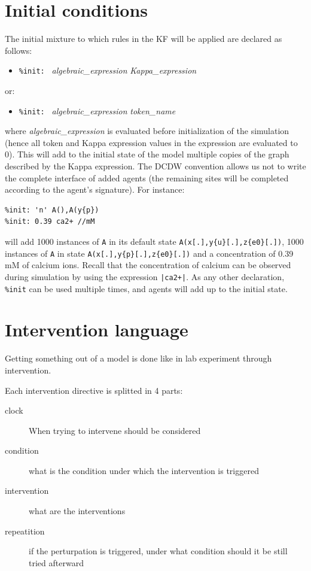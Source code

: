 \documentclass[11pt]{book}
\def\ttt#1{\texttt{#1}}
\def\ITE#1{\begin{itemize}#1\end{itemize}}
\begin{document}
\section{Initial conditions}\label{sec:init}

The initial mixture to which rules in the
KF will be applied are declared as follows: \ITE{
\item[] \ttt{\%init: } \textit{algebraic\_expression} \textit{Kappa\_expression}
}
or:
\ITE{
\item[] \ttt{\%init: }  \textit{algebraic\_expression} \textit{token\_name}
}

where \textit{algebraic\_expression} is evaluated before
initialization of the simulation (hence all token and Kappa expression
values in the expression are evaluated to 0). This will add to the
initial state of the model multiple copies of the graph described by
the Kappa expression. The DCDW convention allows us not to write the complete interface of added agents
(the remaining sites will be completed according to the agent's
signature). For instance:
\begin{lstlisting}[language=kappa]
%var: 'n' 1000
%init: 'n' A(),A(y{p})
%init: 0.39 ca2+ //mM
\end{lstlisting}
will add 1000 instances of \ttt{A} in its default state
\ttt{A(x[.],y\{u\}[.],z\{e0\}[.])}, 1000 instances of \ttt{A} in
state \ttt{A(x[.],y\{p\}[.],z\{e0\}[.])} and a concentration of 0.39
mM of calcium ions. Recall that the concentration of calcium can be
observed during simulation by using the expression \ttt{|ca2+|}.  As
any other declaration, \ttt{\%init} can be used
multiple times, and agents will add up to the initial state.

\section{Intervention language}\label{sec:mod}
Getting something out of a model is done like in lab experiment
through intervention.

Each intervention directive is splitted in 4 parts:
\begin{description}
\item[clock] When trying to intervene should be considered
\item[condition] what is the condition under which the intervention is triggered
\item[intervention] what are the interventions
\item[repeatition] if the perturpation is triggered, under what
  condition should it be still tried afterward
\end{description}
\end{document}
